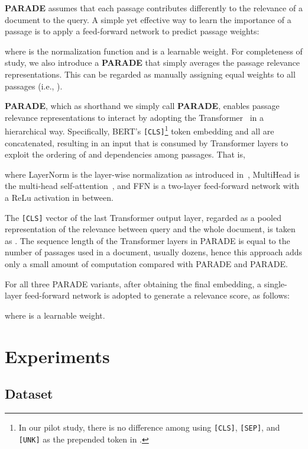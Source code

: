 \documentclass[11pt,a4paper]{article}
\newcommand{\parade}[1]{PARADE}
\begin{document}
{\bf \parade{Attn}} assumes that each passage contributes differently to the relevance of a document to the query.
A simple yet effective way to learn the importance of a passage is to apply a feed-forward network to predict passage weights:


where  is the normalization function and  is a learnable weight.
For completeness of study, we also introduce a {\bf \parade{Avg}} that simply averages the passage relevance representations.
This can be regarded as manually assigning equal weights to all passages (i.e., ).






{\bf \parade{Transformer}}, which as shorthand we simply call {\bf PARADE}, enables passage relevance representations to interact by adopting the Transformer~\cite{DBLP:conf/nips/VaswaniSPUJGKP17} in a hierarchical way.
Specifically, BERT's \texttt{[CLS]}\footnote{In our pilot study, there is no difference among using \texttt{[CLS]}, \texttt{[SEP]}, and \texttt{[UNK]}  as the prepended token in . } token embedding and all  are concatenated, resulting in an input  that is consumed by Transformer layers to exploit the ordering of and dependencies among passages. That is,

where LayerNorm is the layer-wise normalization as introduced in~\cite{DBLP:journals/corr/BaKH16},
MultiHead is the multi-head self-attention~\cite{DBLP:conf/nips/VaswaniSPUJGKP17}, and
FFN is a two-layer feed-forward network with a ReLu activation in between.


The \texttt{[CLS]} vector of the last Transformer output layer, regarded as a pooled representation of the relevance between query and the whole document, is taken as .
The sequence length of the Transformer layers in PARADE is equal to the number of passages used in a document, usually dozens, hence this approach adds only a small amount of computation compared with \parade{Attn} and \parade{Max}.

For all three PARADE variants, after obtaining the final  embedding, a single-layer feed-forward network is adopted to generate a relevance score, as follows:

where  is a learnable weight. \section{Experiments}
\label{sec:experiment}

\subsection{Dataset} \label{sec:PARADE_dataset}
\end{document}
